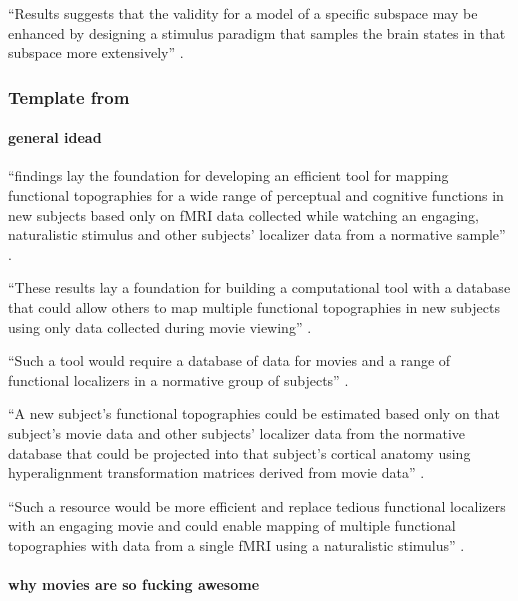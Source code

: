 ``Results suggests that the validity for a model of a specific subspace may be
enhanced by designing a stimulus paradigm that samples the brain states in that
subspace more extensively'' \citep{haxby2011common}.


\subsubsection{Template from \citet{jiahui2020predicting}}


\paragraph{general idead}

``findings lay the foundation for developing an efficient tool for mapping
functional topographies for a wide range of perceptual and cognitive functions
in new subjects based only on fMRI data collected while watching an engaging,
naturalistic stimulus and other subjects' localizer data from a normative
sample'' \citep{jiahui2020predicting}.

%
``These results lay a foundation for building a computational tool with a
database that could allow others to map multiple functional topographies in new
subjects using only data collected during movie viewing''
\citep{jiahui2020predicting}.

%
``Such a tool would require a database of data for movies and a range of
functional localizers in a normative group of subjects''
\citep{jiahui2020predicting}.

%
``A new subject's functional topographies could be estimated based only on that
subject's movie data and other subjects' localizer data from the normative
database that could be projected into that subject's cortical anatomy using
hyperalignment transformation matrices derived from movie data''
\citep{jiahui2020predicting}.

%
``Such a resource would be more efficient and replace tedious functional
localizers with an engaging movie and could enable mapping of multiple
functional topographies with data from a single fMRI using a naturalistic
stimulus'' \citep{jiahui2020predicting}.

\paragraph{why movies are so fucking awesome}

